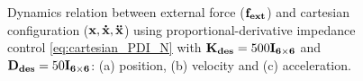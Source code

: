 \begin{figure}
\centering
{}
\caption{Dynamics relation between external force ($\mathbf{f_{ext}}$) and cartesian configuration ($\mathbf{x, \dot{x}, \ddot{x}}$) using proportional-derivative impedance control \eqref{eq:cartesian_PDI_N} with $\mathbf{K_{des}}=500\mathbf{I_{6 \times 6}}$ and $\mathbf{D_{des}}=50\mathbf{I_{6 \times 6}}$: (a) position, (b) velocity and (c) acceleration.}
\label{fig:act2.1_external_force_vs_cartesian_configuration}
\end{figure}

